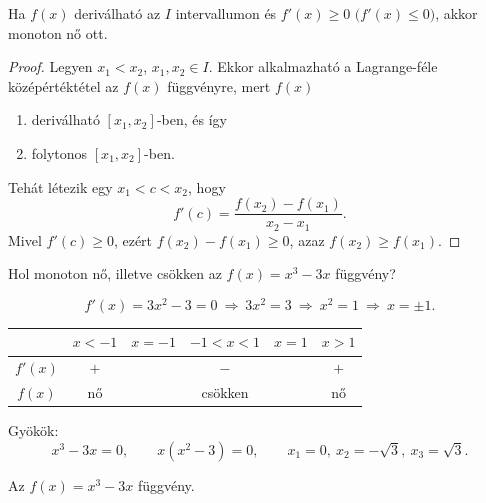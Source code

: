 \documentclass[11pt]{article}
\newcommand{\signtable}{\renewcommand{\arraystretch}{1.45}}
\begin{document}
\begin{thmbox}
\begin{theorem}
Ha $f(x)$ deriválható az $I$ intervallumon és $f'(x)\ge 0$ $\bigl(f'(x)\le 0\bigr)$, akkor monoton nő ott.
\end{theorem}
\end{thmbox}
\begin{proof}
Legyen $x_{1}<x_{2}$, $x_{1}, x_{2}\in I$. Ekkor alkalmazható a Lagrange-féle középértéktétel az $f(x)$ függvényre, mert $f(x)$
\begin{enumerate}[label=\arabic*.]
\item deriválható $[x_{1}, x_{2}]$-ben, és így
\item folytonos $[x_{1}, x_{2}]$-ben.
\end{enumerate}
Tehát létezik egy $x_{1}<c<x_{2}$, hogy
\[
f'(c)=\frac{f(x_{2})-f(x_{1})}{x_{2}-x_{1}}.
\]
Mivel $f'(c)\ge 0$, ezért $f(x_{2})-f(x_{1})\ge 0$, azaz $f(x_{2})\ge f(x_{1})$.
\end{proof}

\begin{exbox}
\begin{example}
Hol monoton nő, illetve csökken az $f(x)=x^{3}-3x$ függvény?
\end{example}
\end{exbox}
\begin{solution}
\[
f'(x)=3x^{2}-3=0\ \Longrightarrow\ 3x^{2}=3\ \Longrightarrow\ x^{2}=1\ \Longrightarrow\ x=\pm 1 .
\]
\begin{center}
\signtable
\begin{tabular}{c|ccccc}
\hline
 & $x<-1$ & $x=-1$ & $-1<x<1$ & $x=1$ & $x>1$\\
\hline
$f'(x)$ & $+$ & & $-$ & & $+$\\
$f(x)$ & nő & & csökken & & nő\\
\hline
\end{tabular}
\end{center}
Gyökök:
\[
x^{3}-3x=0,\qquad x(x^{2}-3)=0,\qquad x_{1}=0,\ x_{2}=-\sqrt{3},\ x_{3}=\sqrt{3}.
\]

\begin{notefig}{Az $f(x)=x^{3}-3x$ függvény.}
\end{notefig}
\end{solution}
\end{document}
